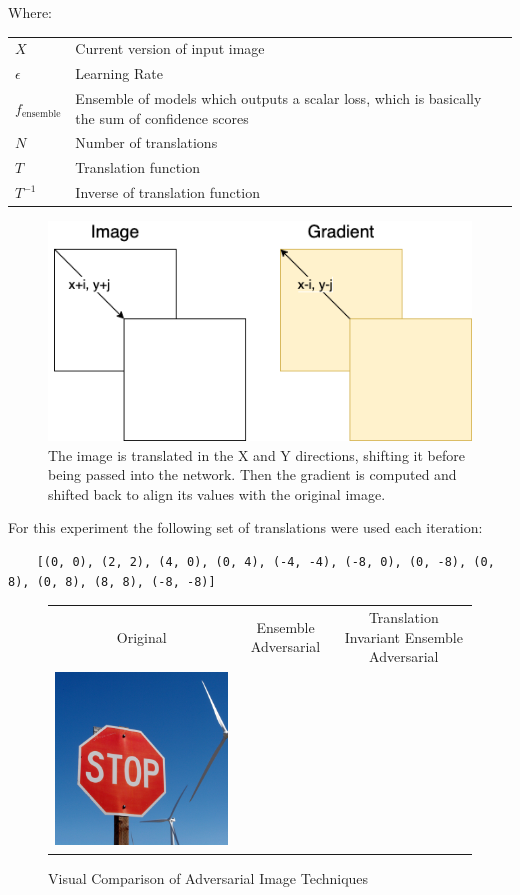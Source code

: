 \documentclass{article}
\begin{document}
Where:
\vspace{0.5cm}

\begin{tabular}{l l}
    $X$ & Current version of input image \\
    $\epsilon$ & Learning Rate \\
    $f_{\text{ensemble}}$ & Ensemble of models which outputs a scalar loss, which is basically the sum of confidence scores \\
    $N$ & Number of translations \\
    $T$ & Translation function \\
    $T^{-1}$ & Inverse of translation function \\[1cm]
\end{tabular}

\begin{figure}
\centering
\includegraphics[width=0.5\linewidth]{images/translation-invariance.png}
\caption{The image is translated in the X and Y directions, shifting it before being passed into the network. Then the gradient is computed and shifted back to align its values with the original image.}
\label{fig:translationInvariance}
\end{figure}

For this experiment the following set of translations were used each iteration:

\begin{verbatim}
    [(0, 0), (2, 2), (4, 0), (0, 4), (-4, -4), (-8, 0), (0, -8), (0, 8), (0, 8), (8, 8), (-8, -8)]
\end{verbatim}

\begin{figure}
\begin{tabular}{c c c}
    Original & Ensemble Adversarial & Translation Invariant Ensemble Adversarial \\
    \includegraphics[width=0.3\linewidth]{../test_images/test_set20/431d3546f1189614.jpg} & & \\
\end{tabular}
\caption{Visual Comparison of Adversarial Image Techniques}
\end{figure}


\clearpage


\end{document}

